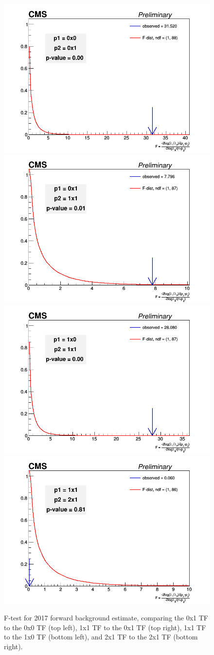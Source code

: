             \begin{figure}[!htbp]
                \begin{center}
                \includegraphics[width=0.4\linewidth]{Plots/tests/ftest_fwd_0x0_vs_0x1_2017.png}
                \includegraphics[width=0.4\linewidth]{Plots/tests/ftest_fwd_0x1_vs_1x1_2017.png}
                \includegraphics[width=0.4\linewidth]{Plots/tests/ftest_fwd_1x0_vs_1x1_2017.png}
                \includegraphics[width=0.4\linewidth]{Plots/tests/ftest_fwd_1x1_vs_2x1_2017.png}
    
                    \caption{F-test for 2017 forward background estimate, comparing the 0x1 TF to the 0x0 TF (top left), 1x1 TF to the 0x1 TF (top right), 1x1 TF to the 1x0 TF (bottom left), and 2x1 TF to the 2x1 TF (bottom right).}
                    \label{fig:ftest17}
                \end{center}
            \end{figure}
            

